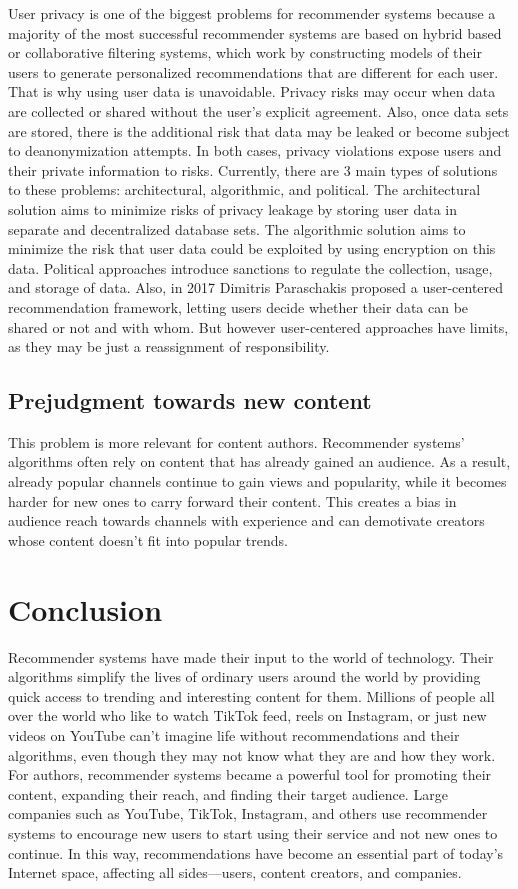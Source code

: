 \documentclass[12pt]{article}
\begin{document}
User privacy is one of the biggest problems for recommender systems because a majority of the most successful recommender systems are based on hybrid based or collaborative filtering systems, which work by constructing models of their users to generate personalized recommendations that are different for each user. That is why using user data is unavoidable. Privacy risks may occur when data are collected or shared without the user’s explicit agreement. Also, once data sets are stored, there is the additional risk that data may be leaked or become subject to deanonymization attempts. In both cases, privacy violations expose users and their private information to risks. 
Currently, there are 3 main types of solutions to these problems: architectural, algorithmic, and political. The architectural solution aims to minimize risks of privacy leakage by storing user data in separate and decentralized database sets. The algorithmic solution aims to minimize the risk that user data could be exploited by using encryption on this data. Political approaches introduce sanctions to regulate the collection, usage, and storage of data. Also, in 2017 Dimitris Paraschakis proposed a user-centered recommendation framework, letting users decide whether their data can be shared or not and with whom. But however user-centered approaches have limits, as they may be just a reassignment of responsibility.
\cite{5.1}

\subsection{Prejudgment towards new content}

This problem is more relevant for content authors. Recommender systems' algorithms often rely on content that has already gained an audience. As a result, already popular channels continue to gain views and popularity, while it becomes harder for new ones to carry forward their content. This creates a bias in audience reach towards channels with experience and can demotivate creators whose content doesn't fit into popular trends.

\section{Conclusion}

Recommender systems have made their input to the world of technology. Their algorithms simplify the lives of ordinary users around the world by providing quick access to trending and interesting content for them. Millions of people all over the world who like to watch TikTok feed, reels on Instagram, or just new videos on YouTube can't imagine life without recommendations and their algorithms, even though they may not know what they are and how they work. For authors, recommender systems became a powerful tool for promoting their content, expanding their reach, and finding their target audience. Large companies such as YouTube, TikTok, Instagram, and others use recommender systems to encourage new users to start using their service and not new ones to continue. In this way, recommendations have become an essential part of today's Internet space, affecting all sides—users, content creators, and companies.



\end{document}
